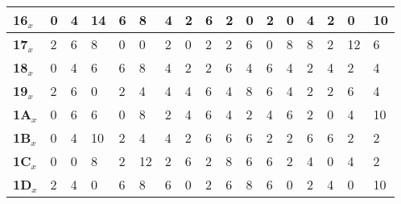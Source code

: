 \begin{longtable}[c]{|l|l|l|l|l|l|l|l|l|l|l|l|l|l|l|l|l|}
\textbf{16$_x$} & 0              & 4              & 14             & 6              & 8              & 4              & 2              & 6              & 2              & 0              & 2              & 0              & 4              & 2              & 0              & 10             \\ \hline
\textbf{17$_x$} & 2              & 6              & 8              & 0              & 0              & 2              & 0              & 2              & 2              & 6              & 0              & 8              & 8              & 2              & 12             & 6              \\ \hline
\textbf{18$_x$} & 0              & 4              & 6              & 6              & 8              & 4              & 2              & 2              & 6              & 4              & 6              & 4              & 2              & 4              & 2              & 4              \\ \hline
\textbf{19$_x$} & 2              & 6              & 0              & 2              & 4              & 4              & 4              & 6              & 4              & 8              & 6              & 4              & 2              & 2              & 6              & 4              \\ \hline
\textbf{1A$_x$} & 0              & 6              & 6              & 0              & 8              & 2              & 4              & 6              & 4              & 2              & 4              & 6              & 2              & 0              & 4              & 10             \\ \hline
\textbf{1B$_x$} & 0              & 4              & 10             & 2              & 4              & 4              & 2              & 6              & 6              & 6              & 2              & 2              & 6              & 6              & 2              & 2              \\ \hline
\textbf{1C$_x$} & 0              & 0              & 8              & 2              & 12             & 2              & 6              & 2              & 8              & 6              & 6              & 2              & 4              & 0              & 4              & 2              \\ \hline
\textbf{1D$_x$} & 2              & 4              & 0              & 6              & 8              & 6              & 0              & 2              & 6              & 8              & 6              & 0              & 2              & 4              & 0              & 10             \\ \hline

\end{longtable}
